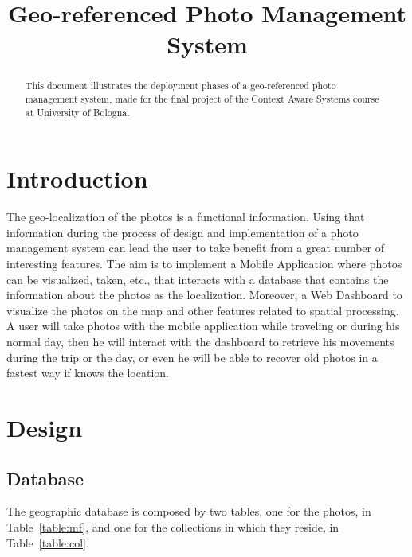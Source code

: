\documentclass[conference]{IEEEtran}
\begin{document}
\title{Geo-referenced Photo Management System\\
}

\author{
}

\maketitle

\begin{abstract}
This document illustrates the deployment phases of a geo-referenced photo management system, made for the final project of the Context Aware Systems course at University of Bologna.
\end{abstract}

\section{Introduction}
The geo-localization of the photos is a functional information. Using that information during the process of design and implementation of a photo management system can lead the user to take benefit from a great number of interesting features. 
The aim is to implement a Mobile Application where photos can be visualized, taken, etc., that interacts with a database that contains the information about the photos as the localization. Moreover, a Web Dashboard to visualize the photos on the map and other features related to spatial processing.
A user will take photos with the mobile application while traveling or during his normal day, then he will interact with the dashboard to retrieve his movements during the trip or the day, or even he will be able to recover old photos in a fastest way if knows the location.

\section{Design}
\subsection{Database}
The geographic database is composed by two tables, one for the photos, in Table~\ref{table:mf}, and one for the collections in which they reside, in Table~\ref{table:col}.
\end{document}
